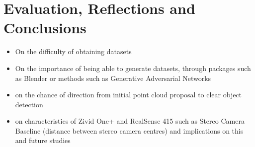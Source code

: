 

\chapter{Evaluation, Reflections and Conclusions}
\label{Eval}

\begin{itemize}
    \item On the difficulty of obtaining datasets
    \item On the importance of being able to generate datasets, through packages such as Blender or methods such as Generative Adversarial Networks
    \item on the chance of direction from initial point cloud proposal to clear object detection
    \item on characteristics of Zivid One+ and RealSense 415 such as Stereo Camera Baseline (distance between stereo camera centres) and implications on this and future studies
\end{itemize}

\lipsum[1]
